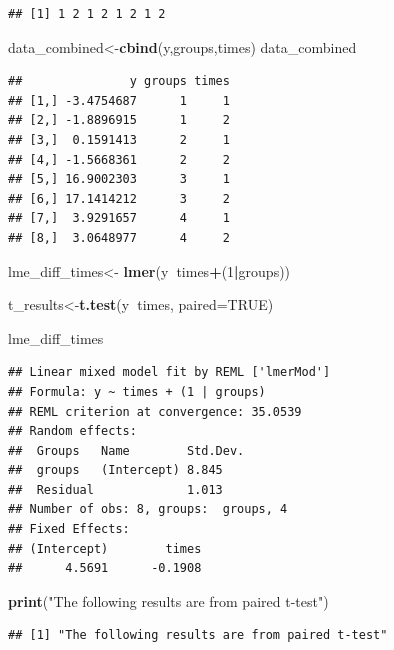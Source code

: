 \documentclass[]{book}
\newenvironment{Shaded}{\begin{snugshade}}{\end{snugshade}}
\newcommand{\KeywordTok}[1]{\textcolor[rgb]{0.13,0.29,0.53}{\textbf{#1}}}
\newcommand{\DataTypeTok}[1]{\textcolor[rgb]{0.13,0.29,0.53}{#1}}
\newcommand{\DecValTok}[1]{\textcolor[rgb]{0.00,0.00,0.81}{#1}}
\newcommand{\StringTok}[1]{\textcolor[rgb]{0.31,0.60,0.02}{#1}}
\newcommand{\OtherTok}[1]{\textcolor[rgb]{0.56,0.35,0.01}{#1}}
\newcommand{\OperatorTok}[1]{\textcolor[rgb]{0.81,0.36,0.00}{\textbf{#1}}}
\newcommand{\NormalTok}[1]{#1}
\begin{document}
\begin{verbatim}
## [1] 1 2 1 2 1 2 1 2
\end{verbatim}

\begin{Shaded}
\begin{Highlighting}[]
\NormalTok{data_combined<-}\KeywordTok{cbind}\NormalTok{(y,groups,times)}
\NormalTok{data_combined}
\end{Highlighting}
\end{Shaded}

\begin{verbatim}
##               y groups times
## [1,] -3.4754687      1     1
## [2,] -1.8896915      1     2
## [3,]  0.1591413      2     1
## [4,] -1.5668361      2     2
## [5,] 16.9002303      3     1
## [6,] 17.1414212      3     2
## [7,]  3.9291657      4     1
## [8,]  3.0648977      4     2
\end{verbatim}

\begin{Shaded}
\begin{Highlighting}[]
\NormalTok{lme_diff_times<-}\StringTok{ }\KeywordTok{lmer}\NormalTok{(y}\OperatorTok{~}\NormalTok{times}\OperatorTok{+}\NormalTok{(}\DecValTok{1}\OperatorTok{|}\NormalTok{groups)) }


\NormalTok{t_results<-}\KeywordTok{t.test}\NormalTok{(y}\OperatorTok{~}\NormalTok{times, }\DataTypeTok{paired=}\OtherTok{TRUE}\NormalTok{)}

\NormalTok{lme_diff_times}
\end{Highlighting}
\end{Shaded}

\begin{verbatim}
## Linear mixed model fit by REML ['lmerMod']
## Formula: y ~ times + (1 | groups)
## REML criterion at convergence: 35.0539
## Random effects:
##  Groups   Name        Std.Dev.
##  groups   (Intercept) 8.845   
##  Residual             1.013   
## Number of obs: 8, groups:  groups, 4
## Fixed Effects:
## (Intercept)        times  
##      4.5691      -0.1908
\end{verbatim}

\begin{Shaded}
\begin{Highlighting}[]
\KeywordTok{print}\NormalTok{(}\StringTok{"The following results are from paired t-test"}\NormalTok{)}
\end{Highlighting}
\end{Shaded}

\begin{verbatim}
## [1] "The following results are from paired t-test"
\end{verbatim}
\end{document}
